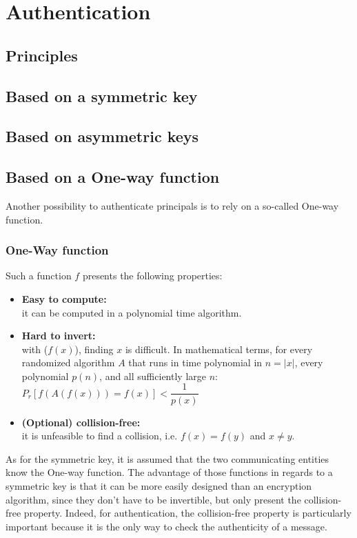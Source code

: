 \section{Authentication}
\subsection{Principles}
\subsection{Based on a symmetric key}
\subsection{Based on asymmetric keys}
\subsection{Based on a One-way function}
Another possibility to authenticate principals is to rely on a so-called One-way function.
\subsubsection{One-Way function}
Such a function $f$ presents the following properties:
\begin{itemize}
	\item \textbf{Easy to compute:} \\
	it can be computed in a polynomial time algorithm.
	\item \textbf{Hard to invert:} \\
	with ($f(x)$), finding $x$ is difficult. In mathematical terms,  for every randomized algorithm $A$ that runs in time polynomial in $n=|x|$, every polynomial $p(n)$, and all sufficiently large $n$: \\
	$ P_{r}[f(A(f(x))) = f(x)] < \dfrac{1}{p(x)}$ 
	\item \textbf{(Optional) collision-free:} \\
	it is unfeasible to find a collision, i.e. $f(x) = f(y)$ and $x \ne y$.
\end{itemize}

As for the symmetric key, it is assumed that the two communicating entities know the One-way function. The advantage of those functions in regards to a symmetric key is that it can be more easily designed than an encryption algorithm, since they don't have to be invertible, but only present the collision-free property. Indeed, for authentication, the collision-free property is particularly important because it is the only way to check the authenticity of a message.

